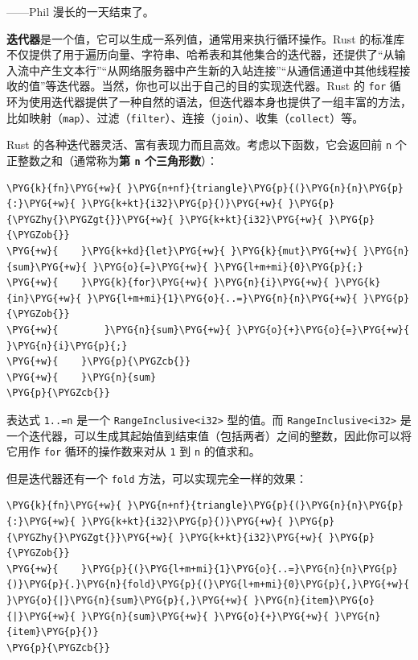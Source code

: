 
\begin{myEpigraph}{——Phil}
漫长的一天结束了。
\end{myEpigraph}

\textbf{迭代器}是一个值，它可以生成一系列值，通常用来执行循环操作。Rust 的标准库不仅提供了用于遍历向量、字符串、哈希表和其他集合的迭代器，还提供了“从输入流中产生文本行”“从网络服务器中产生新的入站连接”“从通信通道中其他线程接收的值”等迭代器。当然，你也可以出于自己的目的实现迭代器。Rust 的 \texttt{for} 循环为使用迭代器提供了一种自然的语法，但迭代器本身也提供了一组丰富的方法，比如映射（\texttt{map}）、过滤（\texttt{filter}）、连接（\texttt{join}）、收集（\texttt{collect}）等。

Rust 的各种迭代器灵活、富有表现力而且高效。考虑以下函数，它会返回前 \texttt{n} 个正整数之和（通常称为\textbf{第 \texttt{n} 个三角形数}）：

\begin{Verbatim}[commandchars=\\\{\},breaklines=true,breakanywhere=true,fontsize=\codefont,xleftmargin=17bp]
\PYG{k}{fn}\PYG{+w}{ }\PYG{n+nf}{triangle}\PYG{p}{(}\PYG{n}{n}\PYG{p}{:}\PYG{+w}{ }\PYG{k+kt}{i32}\PYG{p}{)}\PYG{+w}{ }\PYG{p}{\PYGZhy{}\PYGZgt{}}\PYG{+w}{ }\PYG{k+kt}{i32}\PYG{+w}{ }\PYG{p}{\PYGZob{}}
\PYG{+w}{    }\PYG{k+kd}{let}\PYG{+w}{ }\PYG{k}{mut}\PYG{+w}{ }\PYG{n}{sum}\PYG{+w}{ }\PYG{o}{=}\PYG{+w}{ }\PYG{l+m+mi}{0}\PYG{p}{;}
\PYG{+w}{    }\PYG{k}{for}\PYG{+w}{ }\PYG{n}{i}\PYG{+w}{ }\PYG{k}{in}\PYG{+w}{ }\PYG{l+m+mi}{1}\PYG{o}{..=}\PYG{n}{n}\PYG{+w}{ }\PYG{p}{\PYGZob{}}
\PYG{+w}{        }\PYG{n}{sum}\PYG{+w}{ }\PYG{o}{+}\PYG{o}{=}\PYG{+w}{ }\PYG{n}{i}\PYG{p}{;}
\PYG{+w}{    }\PYG{p}{\PYGZcb{}}
\PYG{+w}{    }\PYG{n}{sum}
\PYG{p}{\PYGZcb{}}
\end{Verbatim}

表达式 \texttt{1..=n} 是一个 \texttt{RangeInclusive<i32>} 型的值。而 \texttt{RangeInclusive<i32>} 是一个迭代器，可以生成其起始值到结束值（包括两者）之间的整数，因此你可以将它用作 \texttt{for} 循环的操作数来对从 \texttt{1} 到 \texttt{n} 的值求和。

但是迭代器还有一个 \texttt{fold} 方法，可以实现完全一样的效果：

\begin{Verbatim}[commandchars=\\\{\},breaklines=true,breakanywhere=true,fontsize=\codefont,xleftmargin=17bp]
\PYG{k}{fn}\PYG{+w}{ }\PYG{n+nf}{triangle}\PYG{p}{(}\PYG{n}{n}\PYG{p}{:}\PYG{+w}{ }\PYG{k+kt}{i32}\PYG{p}{)}\PYG{+w}{ }\PYG{p}{\PYGZhy{}\PYGZgt{}}\PYG{+w}{ }\PYG{k+kt}{i32}\PYG{+w}{ }\PYG{p}{\PYGZob{}}
\PYG{+w}{    }\PYG{p}{(}\PYG{l+m+mi}{1}\PYG{o}{..=}\PYG{n}{n}\PYG{p}{)}\PYG{p}{.}\PYG{n}{fold}\PYG{p}{(}\PYG{l+m+mi}{0}\PYG{p}{,}\PYG{+w}{ }\PYG{o}{|}\PYG{n}{sum}\PYG{p}{,}\PYG{+w}{ }\PYG{n}{item}\PYG{o}{|}\PYG{+w}{ }\PYG{n}{sum}\PYG{+w}{ }\PYG{o}{+}\PYG{+w}{ }\PYG{n}{item}\PYG{p}{)}
\PYG{p}{\PYGZcb{}}
\end{Verbatim}

